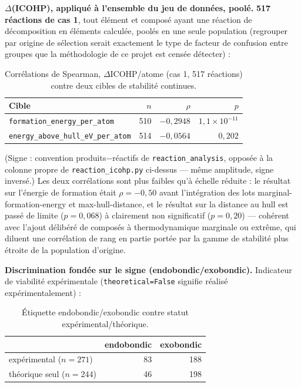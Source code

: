 \documentclass[11pt,a4paper]{article}
\begin{document}
\textbf{$\Delta$(ICOHP), appliqué à l'ensemble du jeu de données, poolé.}
\textbf{517 réactions de cas 1}, tout élément et composé ayant une
réaction de décomposition en éléments calculée, poolés en une seule
population (regrouper par origine de sélection serait exactement le
type de facteur de confusion entre groupes que la méthodologie de ce
projet est censée détecter) :

\begin{table}[htbp]
\centering
\caption{Corrélations de Spearman, $\Delta$ICOHP/atome (cas 1, 517 réactions) contre deux cibles de stabilité continues.}
\label{tab:pooled-targets}
\begin{tabular}{@{}lrrr@{}}
\toprule
Cible & $n$ & $\rho$ & $p$ \\
\midrule
\texttt{formation\_energy\_per\_atom} & 510 & $-0,2948$ & $1,1\times10^{-11}$ \\
\texttt{energy\_above\_hull\_eV\_per\_atom} & 514 & $-0,0564$ & $0,202$ \\
\bottomrule
\end{tabular}
\end{table}

(Signe : convention produits$-$réactifs de \texttt{reaction\_analysis},
opposée à la colonne propre de \texttt{reaction\_icohp.py} ci-dessus ---
même amplitude, signe inversé.) Les deux corrélations sont plus faibles
qu'à échelle réduite : le résultat sur l'énergie de formation était
$\rho=-0,50$ avant l'intégration des lots marginal-formation-energy et
max-hull-distance, et le résultat sur la distance au hull est passé de
limite ($p=0,068$) à clairement non significatif ($p=0,20$) --- cohérent
avec l'ajout délibéré de composés à thermodynamique marginale ou
extrême, qui diluent une corrélation de rang en partie portée par la
gamme de stabilité plus étroite de la population d'origine.

\textbf{Discrimination fondée sur le signe (endobondic/exobondic).}
Indicateur de viabilité expérimentale (\texttt{theoretical=False}
signifie réalisé expérimentalement) :

\begin{table}[htbp]
\centering
\caption{Étiquette endobondic/exobondic contre statut expérimental/théorique.}
\label{tab:fisher}
\begin{tabular}{@{}lrr@{}}
\toprule
 & endobondic & exobondic \\
\midrule
expérimental ($n=271$) & 83 & 188 \\
théorique seul ($n=244$) & 46 & 198 \\
\bottomrule
\end{tabular}
\end{table}
\end{document}
